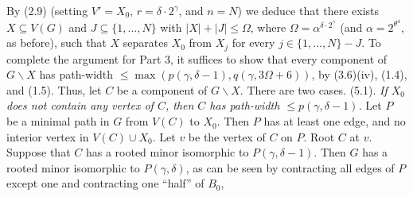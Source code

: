 By (2.9) (setting $V'=X_0$, $r=\delta\cdot 2^\gamma$, and $n=N$) we deduce that there
exists $X\subseteq V(G)$ and $J\subseteq\{1,..., N\}$ with $|X|+|J|\le\Omega$, where $\Omega=\alpha^{\delta\cdot 2^\gamma}$ (and
$\alpha=2^{\theta^4}$, as before), such that $X$ separates $X_0$ from $X_j$ for every
$j\in\{1,..., N\}-J$. To complete the argument for Part 3, it suffices to show
that every component of $G\backslash X$ has path-width ${\le}\max(p(\gamma, \delta-1),
q(\gamma, 3\Omega+6))$, by (3.6)(iv), (1.4), and (1.5). Thus, let $C$ be a component of
$G\backslash X$. There are two cases.
\stmt
(5.1). \textit{If $X_0$ does not contain any vertex of $C$, then $C$ has path-width
${\le}p(\gamma, \delta-1)$.}
\stmt
Let $P$ be a minimal path in $G$ from $V(C)$ to $X_0$. Then $P$ has at least one
edge, and no interior vertex in $V(C)\cup X_0$. Let $v$ be the vertex of $C$ on $P$.
Root $C$ at $v$. Suppose that $C$ has a rooted minor isomorphic to $P(\gamma, \delta-1)$.
Then $G$ has a rooted minor isomorphic to $P(\gamma, \delta)$, as can be seen by
contracting all edges of $P$ except one and contracting one ``half'' of $B_0$,

